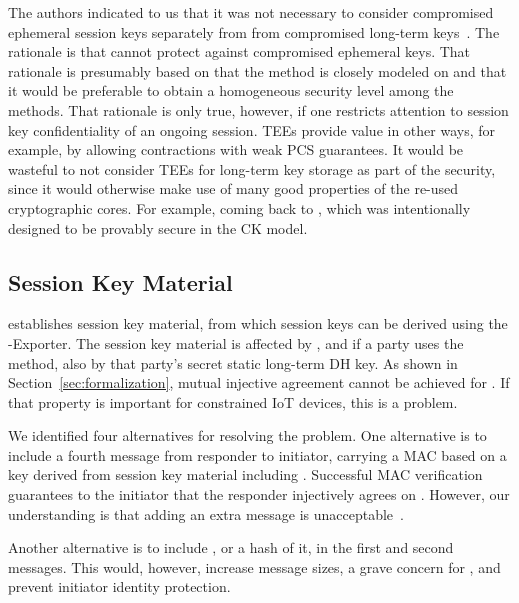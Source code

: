 \documentclass[runningheads, envcountsame, a4paper, draft, x11names]{llncs}
\begin{document}
The \mEdhoc{} authors indicated to us that it was
not necessary to consider compromised ephemeral session keys separately from
from compromised long-term keys~\cite{personalCommunication}.
%
The rationale is that \mSigma{} cannot protect against compromised ephemeral
keys.
%
That rationale is presumably based on that the \mSigSig{} method is
closely modeled on \mSigmaI{} and that it would be preferable to obtain a
homogeneous security level among the \mEdhoc{}
methods\cite{personalCommunication}.
%
That rationale is only true, however, if one restricts attention to session key
confidentiality of an ongoing session.
%
TEEs provide value in other ways, for example, by allowing contractions with
weak PCS guarantees.
%
It would be wasteful to not consider TEEs for long-term key storage as part of
the security, since it would otherwise make use of many good properties of the
re-used cryptographic cores.
%
For example, coming back to \mOptls{}, which was intentionally
designed to be provably secure in the CK model.
%

\subsection{Session Key Material}
\label{sec:sessionKeyMaterial}
\mEdhoc{} establishes session key material, from which session keys
can be derived using the \mEdhoc{}-Exporter.
%
The session key material is affected by \mGxy{}, and if a party uses the
\mStat{} method, also by that party's secret static long-term DH key.
%
As shown in Section~\ref{sec:formalization}, mutual injective agreement cannot
be achieved for \mGiy{}.
%
If that property is important for constrained IoT devices, this is a problem.
%

We identified four alternatives for resolving the problem.
%
One alternative is to include a fourth message from responder to initiator,
carrying a MAC based on a key derived from session key
material including \mGiy{}.
%
Successful MAC verification guarantees
to the initiator that the responder injectively agrees on \mGiy{}.
%
However, our understanding is that adding an extra message is
unacceptable~\cite{personalCommunication}.
%

Another alternative is to include \mGi{}, or a hash of it, in the first and
second messages.
%
This would, however, increase message sizes, a grave concern for \mEdhoc{},
and prevent initiator identity protection.
%
%
\end{document}
